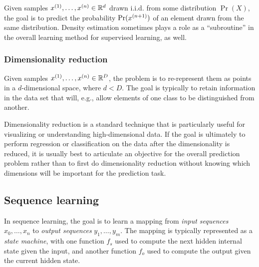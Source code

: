 Given samples $x^{(1)}, \ldots, x^{(n)} \in \mathbb{R}^d$ drawn i.i.d.
from some distribution $\Pr(X)$, the goal is to predict the probability
$\Pr(x^{(n+1)})$ of an element drawn from the same distribution.
Density estimation sometimes plays a role as a ``subroutine'' in the
overall learning method for supervised learning, as well.

\subsubsection{Dimensionality reduction}

Given samples $x^{(1)}, \ldots, x^{(n)} \in \mathbb{R}^D$, the problem is to
re-represent them as points in a $d$-dimensional space, where $d <
  D$.  The goal is typically to retain information in the data set that
will, e.g., allow elements of one class to be distinguished from
another.

Dimensionality reduction is a standard technique that is particularly useful for
visualizing or understanding high-dimensional data.  If the goal is
ultimately to perform regression or classification on the data after
the dimensionality is reduced, it is usually best to articulate an objective
for the overall prediction problem rather than to first do
dimensionality reduction without knowing which dimensions will be
important for the prediction task.

\subsection{Sequence learning}

In sequence learning, the goal is to learn a mapping from {\em input
    sequences} $x_0, \ldots, x_n$ to {\em output sequences} $y_1,
  \ldots, y_m$.  The mapping is typically represented as a {\em state
    machine}, with one function $f_s$ used to compute the next hidden
internal state given the input, and another function $f_o$ used to
compute the output given the current hidden state.

